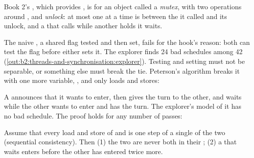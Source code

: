 \begin{remark}\label{def:b2:threads-and-synchronisation:lock}
Book 2's , which provides , is for  an object called a \emph{mutex}, with two operations
around , \emph{} and \emph{unlock}: at most one  at a time is between the  it called
and its unlock, and a  that calls  while another holds it waits.
\end{remark}

The naive , a shared flag tested and then set, fails for the hook's reason: both  can test the flag before
either sets it. The explorer finds 24 bad schedules among 42 (\cref{out:b2:threads-and-synchronisation:explorer}).
Testing and setting must not be separable, or something else must break the tie. Peterson's algorithm breaks it with
one more variable, , and only loads and stores:

\label{lst:b2:threads-and-synchronisation:peterson}

A  announces that it wants to enter, then gives the turn to the other, and waits while the other wants to enter
and has the turn. The explorer's model of it has no bad schedule. The proof holds for any number of passes:

\begin{theorem}\label{thm:b2:threads-and-synchronisation:peterson}
Assume that every load and store of  and  is one step of a single  of the two
 (sequential consistency). Then (1) the two  are never both in their ; (2) a 
that waits enters before the other  has entered twice more.
\end{theorem}

